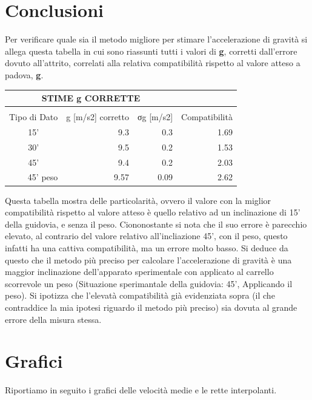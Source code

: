 \documentclass[12pt]{article} %
\begin{document}
\section{Conclusioni}
	Per verificare quale sia il metodo migliore per stimare l'accelerazione di gravità si allega questa tabella in cui sono riassunti tutti i valori di \textbf{g}, corretti dall'errore dovuto all'attrito, correlati alla relativa compatibilità rispetto al valore atteso a padova, \textbf{g}.
\begin{table}[H]
\begin{tabular}{|c|r|r|r|}
\hline
\multicolumn{ 3}{|c|}{STIME g CORRETTE} & \multicolumn{1}{l|}{} \\ \hline
\multicolumn{ 3}{|c|}{} & \multicolumn{1}{l|}{} \\ \hline
\multicolumn{1}{|l|}{Tipo di Dato} & \multicolumn{1}{c|}{g [m/s2] corretto} & \multicolumn{1}{c|}{σg [m/s2]} & \multicolumn{1}{l|}{Compatibilità} \\ \hline
15' & 9.3 & 0.3 & 1.69 \\ \hline
30' & 9.5 & 0.2 & 1.53 \\ \hline
45' & 9.4 & 0.2 & 2.03 \\ \hline
\multicolumn{1}{|r|}{45' peso} & 9.57 & 0.09 & 2.62 \\ \hline
\end{tabular}
\label{tab:stimecorr}
\end{table}

	
Questa tabella mostra delle particolarità, ovvero il valore con la miglior compatibilità rispetto al valore atteso è quello relativo ad un inclinazione di 15' della guidovia, e senza il peso. Ciononostante si nota che il suo errore è parecchio elevato, al contrario del valore relativo all'incliazione 45', con il peso, questo infatti ha una cattiva compatibilità, ma un errore molto basso. 
Si deduce da questo che il metodo più preciso per calcolare l'accelerazione di gravità è una maggior inclinazione dell'apparato sperimentale con applicato al carrello scorrevole un peso (Situazione sperimantale  della guidovia: 45', Applicando il peso). Si ipotizza che l'elevatà compatibilità già evidenziata sopra (il che contraddice la mia ipotesi riguardo il metodo più preciso) sia dovuta al grande errore della misura stessa.


\newpage
\section {Grafici}
	Riportiamo in seguito i grafici delle velocità medie e le rette interpolanti.
\end{document}
